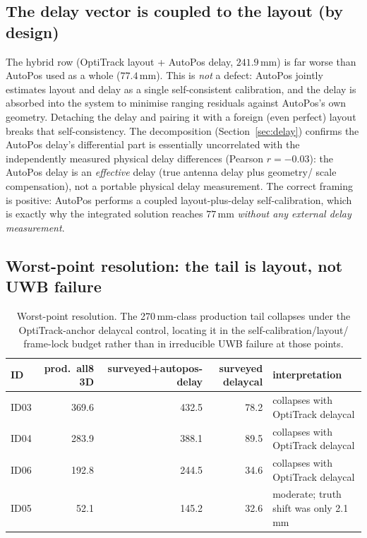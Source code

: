 \documentclass[11pt,a4paper]{article}
\newcommand{\mm}{\,\si{\milli\meter}}
\begin{document}
\subsection{The delay vector is coupled to the layout (by design)}
The hybrid row (OptiTrack layout + AutoPos delay, $241.9\mm$) is far worse than AutoPos used
as a whole ($77.4\mm$). This is \emph{not} a defect: AutoPos jointly estimates layout and
delay as a single self-consistent calibration, and the delay is absorbed into the system to
minimise ranging residuals against AutoPos's own geometry. Detaching the delay and pairing it
with a foreign (even perfect) layout breaks that self-consistency. The decomposition
(Section~\ref{sec:delay}) confirms the AutoPos delay's differential part is essentially
uncorrelated with the independently measured physical delay differences (Pearson
$r=-0.03$): the AutoPos delay is an \emph{effective} delay (true antenna delay plus geometry/
scale compensation), not a portable physical delay measurement. The correct framing is
positive: AutoPos performs a coupled layout-plus-delay self-calibration, which is exactly why
the integrated solution reaches $77\mm$ \emph{without any external delay measurement}.

\subsection{Worst-point resolution: the tail is layout, not UWB failure}
\begin{table}[h]
\centering
\caption{Worst-point resolution. The 270\,\si{\milli\meter}-class production tail collapses
under the OptiTrack-anchor delaycal control, locating it in the self-calibration/layout/
frame-lock budget rather than in irreducible UWB failure at those points.}
\begin{tabular}{lrrrl}
\toprule
ID & prod.\ all8 3D & surveyed+autopos-delay & surveyed delaycal & interpretation \\
\midrule
ID03 & 369.6 & 432.5 & 78.2 & collapses with OptiTrack delaycal \\
ID04 & 283.9 & 388.1 & 89.5 & collapses with OptiTrack delaycal \\
ID06 & 192.8 & 244.5 & 34.6 & collapses with OptiTrack delaycal \\
ID05 & 52.1  & 145.2 & 32.6 & moderate; truth shift was only 2.1\,\si{\milli\meter} \\
\bottomrule
\end{tabular}
\end{table}
\end{document}
